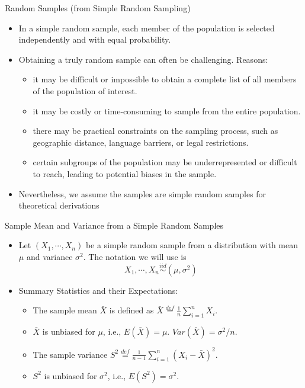 \documentclass[
  ignorenonframetext,
]{beamer}
\providecommand{\tightlist}{%
  \setlength{\itemsep}{0pt}\setlength{\parskip}{0pt}}
\begin{document}
\begin{frame}{Random Samples (from Simple Random Sampling)}
\protect\hypertarget{random-samples-from-simple-random-sampling}{}
\begin{itemize}
\tightlist
\item
  In a simple random sample, each member of the population is selected
  independently and with equal probability.
\item
  Obtaining a truly random sample can often be challenging. Reasons:

  \begin{itemize}
  \tightlist
  \item
    it may be difficult or impossible to obtain a complete list of all
    members of the population of interest.
  \item
    it may be costly or time-consuming to sample from the entire
    population.
  \item
    there may be practical constraints on the sampling process, such as
    geographic distance, language barriers, or legal restrictions.
  \item
    certain subgroups of the population may be underrepresented or
    difficult to reach, leading to potential biases in the sample.
  \end{itemize}
\item
  Nevertheless, we assume the samples are simple random samples for
  theoretical derivations
\end{itemize}
\end{frame}

\begin{frame}{Sample Mean and Variance from a Simple Random Samples}
\protect\hypertarget{sample-mean-and-variance-from-a-simple-random-samples}{}
\begin{itemize}
\item
  Let \((X_1, \cdots, X_n)\) be a simple random sample from a
  distribution with mean \(\mu\) and variance \(\sigma^2\). The notation
  we will use is \[X_1, \cdots, X_n \overset{iid}\sim (\mu, \sigma^2)\]
\item
  Summary Statistics and their Expectations:

  \begin{itemize}
  \tightlist
  \item
    The sample mean \(\bar X\) is defined as
    \(\bar X\overset{def}=\frac{1}{n}\sum_{i=1}^n X_i\).
  \item
    \(\bar X\) is unbiased for \(\mu\), i.e., \(E(\bar X)=\mu\).
    \(Var(\bar X)=\sigma^2/n\).
  \item
    The sample variance
    \(S^2\overset{def}=\frac{1}{n-1}\sum_{i=1}^n (X_i-\bar X)^2\).
  \item
    \(S^2\) is unbiased for \(\sigma^2\), i.e., \(E(S^2)=\sigma^2\).
  \end{itemize}
\end{itemize}
\end{frame}
\end{document}
